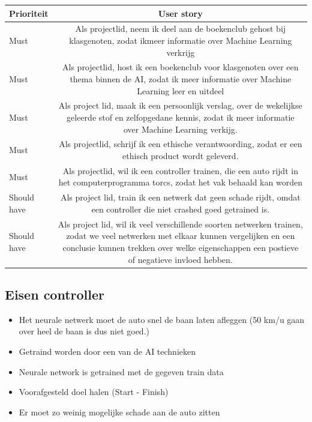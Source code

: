 \documentclass{article}
\begin{document}
\begin{table}[h]
\begin{tabularx}{\textwidth}{l C}
 \textbf{Prioriteit} & \textbf{User story}\\ \hline
 Must & Als projectlid, neem ik deel aan de boekenclub gehost bij klasgenoten, 
zodat ikmeer informatie over Machine Learning verkrijg\\ \hline
 Must & Als projectlid, host ik een boekenclub voor klasgenoten over een thema binnen de AI, zodat ik meer informatie over Machine Learning leer en uitdeel\\\hline
Must & Als project lid, maak ik een persoonlijk verslag, over de wekelijkse geleerde stof en zelfopgedane kennis, zodat ik meer informatie over Machine Learning verkijg.   \\\hline
 Must & Als projectlid, schrijf ik een ethische verantwoording, zodat er een ethisch product wordt geleverd.   \\\hline
 Must & Als projectlid, wil ik een controller trainen, die een auto rijdt in het computerprogramma torcs, zodat het vak behaald kan worden \\\hline
Should have & Als project lid, train ik een netwerk dat geen schade rijdt, omdat een controller die niet crashed goed getrained is. \\\hline
Should have & Als project lid, wil ik veel verschillende soorten netwerken trainen, zodat we veel netwerken met elkaar kunnen vergelijken en een conclusie kunnen trekken over welke eigenschappen een postieve of negatieve invloed hebben. \\
\end{tabularx}
\end{table} 
 
\subsection*{Eisen controller}
\begin{itemize}
\item Het neurale netwerk moet de auto snel de baan laten afleggen (50 km/u gaan over heel de baan is dus niet goed.)
\item Getraind worden door een van de AI technieken
\item Neurale network is getrained met de gegeven train data
\item Voorafgesteld doel halen (Start - Finish)
\item Er moet zo weinig mogelijke schade aan de auto zitten
\end{itemize}
\end{document}
